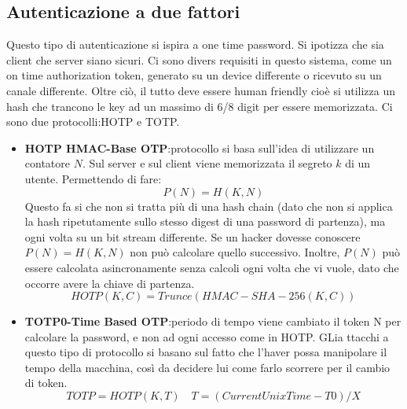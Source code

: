 \documentclass{book}
\theoremstyle{remark}
\begin{document}
\subsection{Autenticazione a due fattori}
Questo tipo di autenticazione si ispira a one time password\@. Si ipotizza che sia client che server siano sicuri\@. Ci sono divers requisiti in questo sistema, come un on time authorization token, generato su un device differente o ricevuto su un canale differente\@. Oltre ciò, il tutto deve essere human friendly cioè si utilizza un hash che trancono le key ad un massimo di 6/8 digit per essere memorizzata\@.\newline
Ci sono due protocolli:HOTP e TOTP\@.\begin{itemize}
	\item \textbf{HOTP HMAC-Base OTP}:\@Questo protocollo si basa sull'idea di utilizzare un contatore \(N\)\@. Sul server e sul client viene memorizzata il segreto \(k\) di un utente\@. Permettendo di fare:\begin{equation*}
		      P(N)=H(K,N)
	      \end{equation*}
	      Questo fa si che non si tratta più di una hash chain (dato che non si applica la hash ripetutamente sullo stesso digest di una password di partenza), ma ogni volta su un bit stream differente\@. Se un hacker dovesse conoscere \(P(N)=H(K,N)\) non può calcolare quello successivo\@. Inoltre, \(P(N)\) può essere calcolata asincronamente senza calcoli ogni volta che vi vuole, dato che occorre avere la chiave di partenza\@.
	      \begin{equation*}
		      HOTP(K,C)=Trunce(HMAC-SHA-256(K,C))
	      \end{equation*}
	\item \textbf{TOTP0-Time Based OTP}:\@ogni periodo di tempo viene cambiato il token N per calcolare la password, e non ad ogni accesso come in HOTP\@. GLia ttacchi a questo tipo di protocollo si basano sul fatto che l'haver possa manipolare il tempo della macchina, così da decidere lui come farlo scorrere per il cambio di token\@.
	      \begin{equation*}
		      TOTP=HOTP(K,T)\quad T=(Current Unix Time-T0)/X
	      \end{equation*}
\end{itemize}
\end{document}
